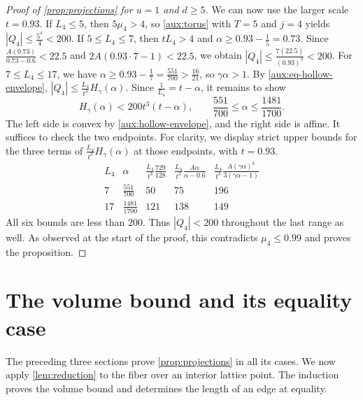 \documentclass[reqno, 11pt]{article}
\numberwithin{equation}{section}
\theoremstyle{definition}
\begin{document}
\begin{proof}[Proof of \cref{prop:projections} for $u=1$ and $d\ge5$]
We can now use the larger scale $t=0.93$. If $L_4\le5$, then
$5\mu_4>4$, so \cref{aux:torus} with $T=5$ and $j=4$ yields
$|Q_4|\le\frac{5^4}{4}<200$. If $5\le L_4\le7$, then $tL_4>4$ and
$\alpha\ge0.93-\frac{1}{5}=0.73$. Since
$\frac{A(0.73)}{0.73-0.6}<22.5$ and $2A(0.93\cdot7-1)<22.5$,
we obtain $|Q_4|\le\frac{7(22.5)}{(0.93)^3}<200$.
For $7\le L_4\le17$, we have
$\alpha\ge0.93-\frac{1}{7}=\frac{551}{700}>\frac{16}{21}$,
so $\gamma\alpha>1$. By \eqref{aux:eq-hollow-envelope},
$|Q_4|\le\frac{L_4}{t^3}H_\gamma(\alpha)$. Since
$\frac{1}{L_4}=t-\alpha$, it remains to show
\[
 H_\gamma(\alpha)<200t^3(t-\alpha),\qquad
        \frac{551}{700}\le\alpha\le\frac{1481}{1700}.
\]
The left side is convex by \cref{aux:hollow-envelope}, and the right
side is affine. It suffices to check the two endpoints. For clarity,
we display strict upper bounds for the three terms of
$\frac{L_4}{t^3}H_\gamma(\alpha)$ at those endpoints, with $t=0.93$.
\[
\begin{array}{c|c|ccc}
 L_4&\alpha&
 \frac{L_4}{t^3}\frac{729}{128}&
 \frac{L_4}{t^3}\frac{A\alpha}{\alpha-0.6}&
 \frac{L_4}{t^3}\frac{A(\gamma\alpha)^3}{3(\gamma\alpha-1)}
 \\ \hline
 7 & \frac{551}{700} &50&75&196\\[2pt]
 17& \frac{1481}{1700} &121&138&149
\end{array}
\]
All six bounds are less than $200$. Thus $|Q_4|<200$ throughout the
last range as well. As observed at the start of the proof, this
contradicts $\mu_4\le0.99$ and proves the proposition.
\end{proof}

\section{The volume bound and its equality case}\label{sec:volume-proof}

The preceding three sections prove \cref{prop:projections} in all
its cases. We now apply \cref{lem:reduction} to the fiber over an
interior lattice point. The induction proves the volume bound and determines the
length of an edge at equality.
\end{document}

